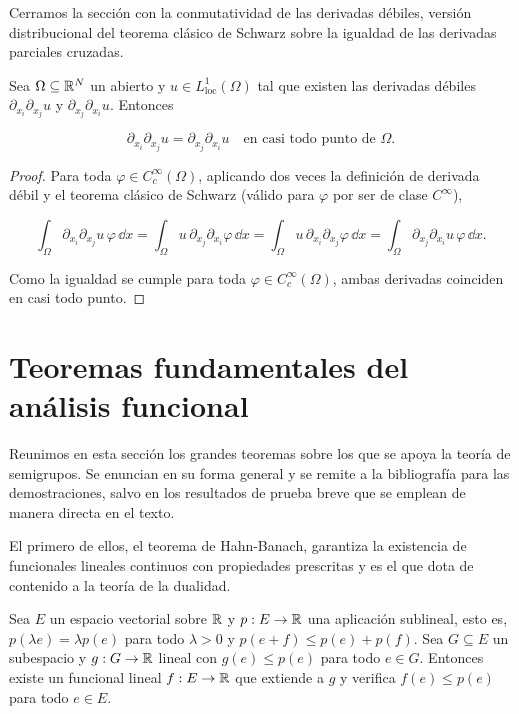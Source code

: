 Cerramos la sección con la conmutatividad de las derivadas débiles, versión
distribucional del teorema clásico de Schwarz sobre la igualdad de las derivadas
parciales cruzadas.\\

\begin{Teorema}
\label{ch:preliminares:th:schwarz}

Sea $\Omega \subseteq \mathbb{R}^N$ un abierto y $u \in L^1_{\mathrm{loc}}(\Omega)$ tal
que existen las derivadas débiles $\partial_{x_i}\partial_{x_j} u$ y
$\partial_{x_j}\partial_{x_i} u$. Entonces

\[\partial_{x_i}\partial_{x_j} u = \partial_{x_j}\partial_{x_i} u \quad \text{en casi todo punto de } \Omega.\]
\end{Teorema}

\begin{proof}
Para toda $\varphi \in C_c^\infty(\Omega)$, aplicando dos veces la definición de
derivada débil y el teorema clásico de Schwarz (válido para $\varphi$ por ser de
clase $C^\infty$),

\[\int_\Omega \partial_{x_i}\partial_{x_j} u \, \varphi \, \dd x = \int_\Omega u \, \partial_{x_j}\partial_{x_i}\varphi \, \dd x = \int_\Omega u \, \partial_{x_i}\partial_{x_j}\varphi \, \dd x = \int_\Omega \partial_{x_j}\partial_{x_i} u \, \varphi \, \dd x.\]

Como la igualdad se cumple para toda $\varphi \in C_c^\infty(\Omega)$, ambas
derivadas coinciden en casi todo punto.
\end{proof}

\section{Teoremas fundamentales del análisis funcional}
\label{ch:preliminares:section:teoremas}

Reunimos en esta sección los grandes teoremas sobre los que se apoya la teoría de
semigrupos. Se enuncian en su forma general y se remite a la bibliografía para
las demostraciones, salvo en los resultados de prueba breve que se emplean de
manera directa en el texto.

El primero de ellos, el teorema de Hahn-Banach, garantiza la existencia de
funcionales lineales continuos con propiedades prescritas y es el que dota de
contenido a la teoría de la dualidad.\\

\begin{Teorema}
\label{ch:preliminares:th:hahnBanach}

Sea $E$ un espacio vectorial sobre $\mathbb{R}$ y $p : E \rightarrow \mathbb{R}$ una aplicación
sublineal, esto es, $p(\lambda e) = \lambda p(e)$ para todo $\lambda > 0$ y
$p(e + f) \leq p(e) + p(f)$. Sea $G \subseteq E$ un subespacio y
$g : G \rightarrow \mathbb{R}$ lineal con $g(e) \leq p(e)$ para todo $e \in G$. Entonces
existe un funcional lineal $f : E \rightarrow \mathbb{R}$ que extiende a $g$ y verifica
$f(e) \leq p(e)$ para todo $e \in E$.
\end{Teorema}

